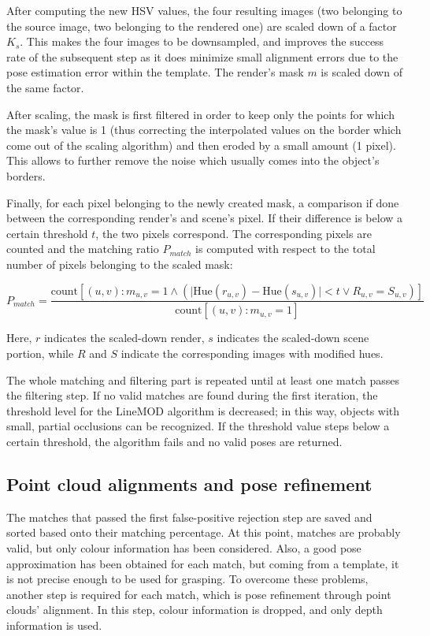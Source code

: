 After computing the new HSV values, the four resulting images (two belonging to
the source image, two belonging to the rendered one) are scaled down of a
factor $K_s$. This makes the four images to be downsampled, and improves the
success rate of the subsequent step as it does minimize small alignment errors
due to the pose estimation error within the template. The render's mask $m$ is
scaled down of the same factor.

After scaling, the mask is first filtered in order to keep only the points for
which the mask's value is 1 (thus correcting the interpolated values on the
border which come out of the scaling algorithm) and then
eroded by a small amount (1 pixel). This allows to further remove the noise
which usually comes into the object's borders.

Finally, for each pixel belonging to the newly created mask, a comparison if
done between the corresponding render's and scene's pixel. If their difference
is below a certain threshold $t$, the two pixels correspond. The corresponding
pixels are counted and the matching ratio $P_{match}$ is computed with respect to the
total number of pixels belonging to the scaled mask:

\begin{equation}
P_{match}=\frac{\text{count}\left[(u,v) : m_{u,v}=1 \wedge \left( \lvert
\text{Hue}(r_{u,v})-\text{Hue}(s_{u,v})\rvert < t \vee R_{u,v}=S_{u,v} \right)
\right]
}{\text{count}\left[ (u,v) : m_{u,v}=1 \right] }
\end{equation}

Here, $r$ indicates the scaled-down render, $s$ indicates the scaled-down scene
portion, while $R$ and $S$ indicate the corresponding images with modified hues.

The whole matching and filtering part is repeated until at least one match
passes the filtering step. If no valid matches are found during the first
iteration, the threshold level for the LineMOD algorithm is decreased; in this
way, objects with small, partial occlusions can be recognized. If the threshold
value steps below a certain threshold, the algorithm fails and no valid poses
are returned.

\subsection{Point cloud alignments and pose refinement}
The matches that passed the first false-positive rejection step are saved and
sorted based onto their matching percentage. At this point, matches are probably
valid, but only colour information has been considered. Also, a good pose
approximation has been obtained for each match, but coming from a template, it
is not precise enough to be used for grasping. To overcome these problems,
another step is required for each match, which is pose refinement through point
clouds' alignment. In this step, colour information is dropped, and only depth
information is used. 

